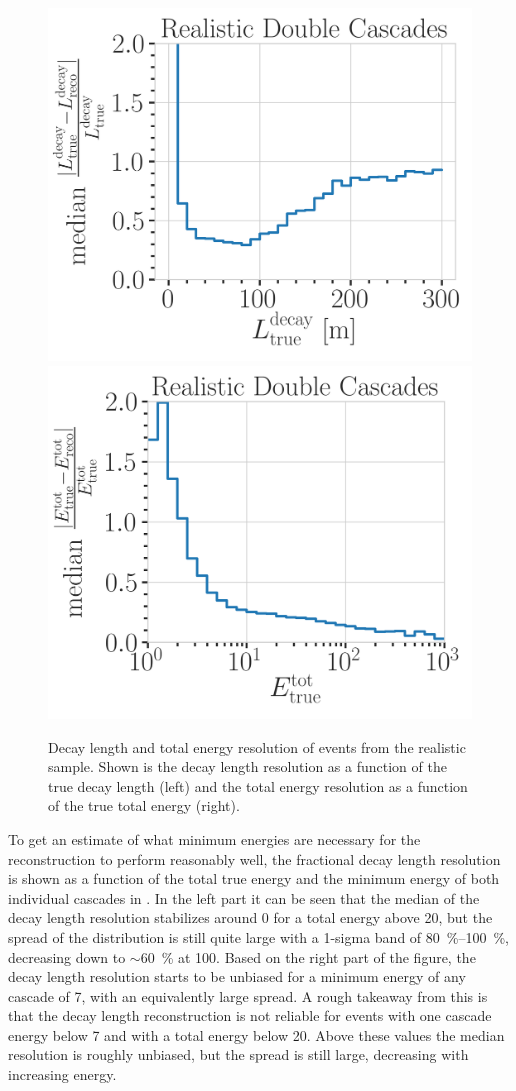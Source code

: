 \begin{figure}[h]
	\centering
    \includegraphics[width=0.49\linewidth]{figures/model_independent_simulation/results/realistic/resolutions/194603_median_decay_length_resolution_goodfit_log_unweighted.png}
    \includegraphics[width=0.49\linewidth]{figures/model_independent_simulation/results/realistic/resolutions/194603_median_absolute_fractional_reco_total_energy_error_goodfit.png} 
    \caption[Realistic double-cascade decay length and total energy resolution]{Decay length and total energy resolution of events from the realistic sample. Shown is the decay length resolution as a function of the true decay length (left) and the total energy resolution as a function of the true total energy (right).}
\end{figure}

To get an estimate of what minimum energies are necessary for the reconstruction to perform reasonably well, the fractional decay length resolution is shown as a function of the total true energy and the minimum energy of both individual cascades in . In the left part it can be seen that the median of the decay length resolution stabilizes around 0 for a total energy above \SI{20}{\gev}, but the spread of the distribution is still quite large with a 1-sigma band of \SIrange{80}{100}{\percent}, decreasing down to $\sim$\SI{60}{\percent} at \SI{100}{\gev}. Based on the right part of the figure, the decay length resolution starts to be unbiased for a minimum energy of any cascade of \SI{7}{\gev}, with an equivalently large spread. A rough takeaway from this is that the decay length reconstruction is not reliable for events with one cascade energy below \SI{7}{\gev} and with a total energy below \SI{20}{\gev}. Above these values the median resolution is roughly unbiased, but the spread is still large, decreasing with increasing energy.

